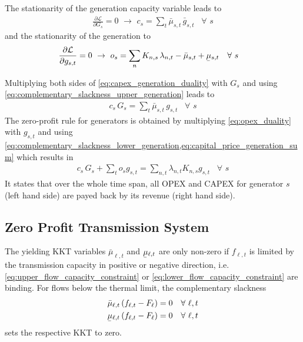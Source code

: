 \documentclass[11pt,twocolumn]{article}
\newcommand{\ubar}[1]{\underaccent{\bar}{#1}}
\newcommand{\Forall}[1]{\hspace{10pt} \forall \,\, #1 }
\newcommand{\pdv}[2]{\frac{\partial #1}{\partial #2}}
\newcommand{\generation}{g_{s,t}}
\newcommand{\generationpotential}{\bar{g}_{s,t}}
\newcommand{\capacitygeneration}{G_{s}}
\newcommand{\operationalpricegeneration}{o_{s}}
\newcommand{\capitalpricegeneration}{c_{s}}
\newcommand{\mulowergeneration}{\ubar{\mu}_{s,t}}
\newcommand{\muuppergeneration}{\bar{\mu}_{s,t}}
\newcommand{\flow}{f_{\ell,t}}
\newcommand{\capacityflow}{F_{\ell}}
\newcommand{\mulowerflow}{\ubar{\mu}_{\ell,t}}
\newcommand{\muupperflow}{\bar{\mu}_{\ell,t}}
\newcommand{\lagrangian}{\mathcal{L}}
\newcommand{\lmp}[1][n]{\lambda_{#1,t}}
\newcommand{\incidencegenerator}[1][n]{K_{#1,s}}
\begin{document}
The stationarity of the generation capacity variable leads to 
\begin{align}
\pdv{\lagrangian}{\capacitygeneration}  = 0 \,\, \rightarrow \,\, 
\capitalpricegeneration =  \sum_t \muuppergeneration \, \generationpotential  \Forall{s}
\label{eq:capex_generation_duality}
\end{align}
and the stationarity of the generation to 
\begin{align}
\pdv{\lagrangian}{\generation} &= 0 \,\, \rightarrow \,\,  
\operationalpricegeneration =  \sum_n \incidencegenerator \, \lmp - \muuppergeneration + \mulowergeneration \Forall{s} \label{eq:opex_duality}
\end{align}


Multiplying both sides of \cref{eq:capex_generation_duality} with $\capacitygeneration$ and using \cref{eq:complementary_slackness_upper_generation} leads to 
\begin{align}
 \capitalpricegeneration \, \capacitygeneration  = \sum_t \muuppergeneration \, \generation \Forall{s} 
 \label{eq:capital_price_generation_sum}
\end{align}
The zero-profit rule for generators is obtained by multiplying \cref{eq:opex_duality} with $\generation$ and using \cref{eq:complementary_slackness_lower_generation,eq:capital_price_generation_sum} which results in 
\begin{align}
  \capitalpricegeneration \, \capacitygeneration + \sum_t \operationalpricegeneration \generation = \sum_{n,t} \lmp \incidencegenerator \generation \Forall{s}
\end{align}
It states that over the whole time span, all OPEX and CAPEX for generator $s$ (left hand side) are payed back by its revenue (right hand side).

\subsection{Zero Profit Transmission System}
\label{sec:zero_profit_flow}

The yielding KKT variables $\muupperflow$ and $\mulowerflow$ are only non-zero if $\flow$ is limited by the transmission capacity in positive or negative direction, i.e. \cref{eq:upper_flow_capacity_constraint} or \cref{eq:lower_flow_capacity_constraint} are binding. For flows below the thermal limit, the complementary slackness 
\begin{align}
\muupperflow \left( \flow - \capacityflow \right)  &= 0 \Forall{\ell,t}
\label{eq:complementary_slackness_upper_flow} \\
\mulowerflow \left( \flow - \capacityflow \right) &=  0 \Forall{\ell,t}
\label{eq:complementary_slackness_lower_flow} 
\end{align}
sets the respective KKT to zero. 
\end{document}
